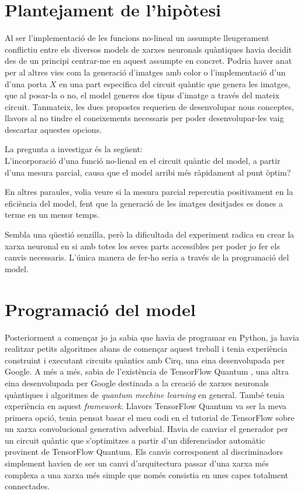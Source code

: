 \chapter{Plantejament de l'hipòtesi}

Al ser l'implementació de les funcions no-lineal un assumpte lleugerament conflictiu entre els diversos models de xarxes neuronals quàntiques havia decidit des de un principi centrar-me en aquest assumpte en concret. Podria haver anat per al altres vies com la generació d'imatges amb color o l'implementació d'un d'una porta $X$ en una part especifica del circuit quàntic que genera les imatges, que al posar-la o no, el model generes dos tipus d'imatge a través del mateix circuit. Tanmateix, les dues propostes requerien de desenvolupar nous conceptes, llavors al no tindre el coneixements necessaris per poder desenvolupar-les vaig descartar aquestes opcions. 

La pregunta a investigar és la següent: \\
L'incorporació d'una funció no-lienal en el circuit quàntic del model, a partir d'una mesura parcial, causa que el model arribi més ràpidament al punt òptim?

En altres paraules, volia veure si la mesura parcial repercutia positivament en la eficiència del model, fent que la generació de les imatges desitjades es dones a terme en un menor temps. 

Sembla una qüestió senzilla, però la dificultada del experiment radica en crear la xarxa neuronal en si amb totes les seves parts accessibles per poder jo fer els canvis necessaris. L'única manera de fer-ho seria a través de la programació del model. 

\chapter{Programació del model}

Posteriorment a començar jo ja sabia que havia de programar en Python, ja havia realitzar petits algoritmes abans de començar aquest treball i tenia experiència construint i executant circuits quàntics amb Cirq, una eina desenvolupada per Google. A més a més, sabia de l'existència de TensorFlow Quantum \cite{tfq}, una altra eina desenvolupada per Google destinada a la creació de xarxes neuronals quàntiques i algoritmes de \textit{quantum mechine learning} en general. També tenia experiència en aquest \textit{framework}. Llavors TensorFlow Quantum va ser la meva primera opció, tenia pensat basar el meu codi en el tutorial de TensorFlow sobre un xarxa convolucional generativa adverbial. Havia de canviar el generador per un circuit quàntic que s'optimitzes a partir d'un diferenciador automàtic provinent de TensorFlow Quantum. Els canvis corresponent al discriminadors simplement havien de ser un canvi d'arquitectura passar d'una xarxa més complexa a una xarxa més simple que només consistia en unes capes totalment connectades. 

